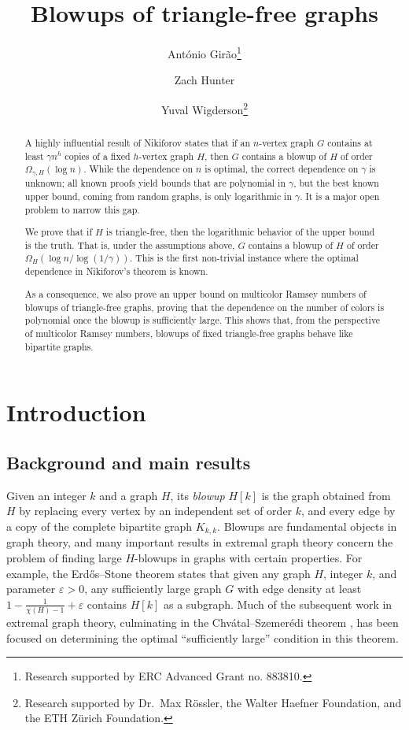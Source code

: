 \documentclass{aic}
\theoremstyle{plain}
\theoremstyle{remark}
\begin{document}
\begin{frontmatter}[classification=text]
\title{Blowups of triangle-free graphs}
\author[antonio]{Ant\'onio Gir\~ao\thanks{Research supported by ERC Advanced Grant no. 883810.}}
\author[zach]{Zach Hunter}
\author[yuval]{Yuval Wigderson\thanks{Research supported by Dr.\ Max R\"{o}ssler, the Walter Haefner Foundation, and the ETH Z\"{u}rich Foundation.}}

\begin{abstract}
    A highly influential result of Nikiforov states that if an $n$-vertex graph $G$ contains at least $\gamma n^h$ copies of a fixed $h$-vertex graph $H$, then $G$ contains a blowup of $H$ of order $\Omega_{\gamma,H}(\log n)$. While the dependence on $n$ is optimal, the correct dependence on $\gamma$ is unknown; all known proofs yield bounds that are polynomial in $\gamma$, but the best known upper bound, coming from random graphs, is only logarithmic in $\gamma$. It is a major open problem to narrow this gap.

    We prove that if $H$ is triangle-free, then the logarithmic behavior of the upper bound is the truth. That is, under the assumptions above, $G$ contains a blowup of $H$ of order $\Omega_H (\log n/{\log(1/\gamma)})$. This is the first non-trivial instance where the optimal dependence in Nikiforov's theorem is known.

    As a consequence, we also prove an upper bound on multicolor Ramsey numbers of blowups of triangle-free graphs, proving that the dependence on the number of colors is polynomial once the blowup is sufficiently large. This shows that, from the perspective of multicolor Ramsey numbers, blowups of fixed triangle-free graphs behave like bipartite graphs.
\end{abstract}
\end{frontmatter}


\section{Introduction}
\subsection{Background and main results}
Given an integer $k$ and a graph $H$, its \emph{blowup} $H[k]$ is the graph obtained from $H$ by replacing every vertex by an independent set of order $k$, and every edge by a copy of the complete bipartite graph $K_{k,k}$. Blowups are fundamental objects in graph theory, and many important results in extremal graph theory concern the problem of finding large $H$-blowups in graphs with certain properties. For example, the Erd\H os--Stone theorem \cite{MR0018807} states that given any graph $H$, integer $k$, and parameter $\varepsilon>0$, any sufficiently large graph $G$ with edge density at least $1-\frac{1}{\chi(H)-1}+\varepsilon$ contains $H[k]$ as a subgraph. Much of the subsequent work in extremal graph theory, culminating in the Chv\'atal--Szemer\'edi theorem \cite{MR0609100}, has been focused on determining the optimal ``sufficiently large'' condition in this theorem.
\end{document}
